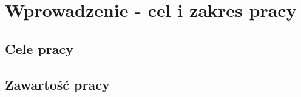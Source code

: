 \chapter{Wprowadzenie - cel i zakres pracy}
\label{cha:intro}

\section{Cele pracy}
\label{sec:celePracy}

\section{Zawartość pracy}
\label{sec:zawartoscPracy}